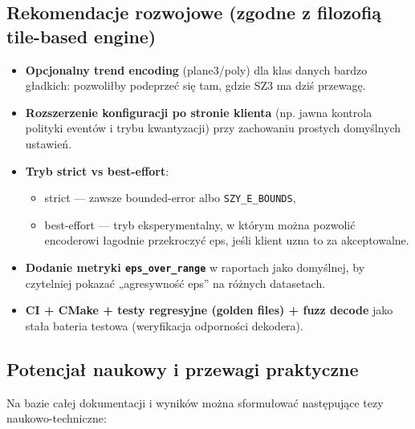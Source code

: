 \documentclass[11pt,a4paper]{article}
\begin{document}
\subsection{Rekomendacje rozwojowe (zgodne z filozofią tile-based engine)}
\begin{itemize}
  \item \textbf{Opcjonalny trend encoding} (plane3/poly) dla klas danych bardzo gładkich: pozwoliłby podeprzeć się tam, gdzie SZ3 ma dziś przewagę.
  \item \textbf{Rozszerzenie konfiguracji po stronie klienta} (np. jawna kontrola polityki eventów i trybu kwantyzacji) przy zachowaniu prostych domyślnych ustawień.
  \item \textbf{Tryb strict vs best-effort}:
        \begin{itemize}
          \item strict --- zawsze bounded-error albo \texttt{SZY\_E\_BOUNDS},
          \item best-effort --- tryb eksperymentalny, w którym można pozwolić encoderowi łagodnie przekroczyć eps, jeśli klient uzna to za akceptowalne.
        \end{itemize}
  \item \textbf{Dodanie metryki \texttt{eps\_over\_range}} w raportach jako domyślnej, by czytelniej pokazać „agresywność eps” na różnych datasetach.
  \item \textbf{CI + CMake + testy regresyjne (golden files) + fuzz decode} jako stała bateria testowa (weryfikacja odporności dekodera).
\end{itemize}

\subsection{Potencjał naukowy i przewagi praktyczne}
Na bazie całej dokumentacji i wyników można sformułować następujące tezy naukowo-techniczne:
\end{document}
